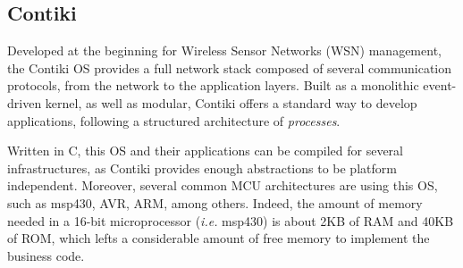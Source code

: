 \subsection{Contiki}
\label{subsec:contiki}
Developed at the beginning for Wireless Sensor Networks (WSN) management, the Contiki OS\cite{dunkels2004contiki} provides a full network stack composed of several communication protocols, from the network to the application layers.
Built as a monolithic event-driven kernel, as well as modular, Contiki offers a standard way to develop applications, following a structured architecture of \textit{processes}.

Written in C, this OS and their applications can be compiled for several infrastructures, as Contiki provides enough abstractions to be platform independent.
Moreover, several common MCU architectures are using this OS, such as msp430, AVR, ARM, among others.
Indeed, the amount of memory needed in a 16-bit microprocessor (\textit{i.e.} msp430) is about 2KB of RAM and 40KB of ROM, which lefts a considerable amount of free memory to implement the business code.

